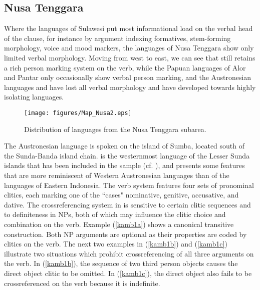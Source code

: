 \subsection{Nusa Tenggara} \label{sec:nus}

Where the languages of Sulawesi put most informational load on the verbal head of the clause, for instance by argument indexing formatives, stem-forming morphology, voice and mood markers, the languages of Nusa Tenggara show only limited verbal morphology. Moving from west to east, we can see that  still retains a rich person marking system on the verb, while the Papuan languages of Alor and Pantar only occasionally show verbal person marking, and the Austronesian languages  and  have lost all verbal morphology and have developed towards highly isolating languages.

\begin{figure}
\texttt{[image: figures/Map\_Nusa2.eps]}
\caption{Distribution of languages from the Nusa Tenggara subarea.}\label{map:Nus}

\end{figure}  

\largerpage[-1]
The Austronesian language  is spoken on the island of Sumba, located south of the Sunda-Banda island chain.  is the westernmost language of the Lesser Sunda islands that has been included in the sample (cf. ), and presents some features that are more reminiscent of Western Austronesian languages than of the languages of Eastern Indonesia. The verb system features four sets of pronominal clitics, each marking one of the ``cases" nominative, genitive, accusative, and dative. The crossreferencing system in  is sensitive to certain clitic sequences and to definiteness in NPs, both of which may influence the clitic choice and combination on the verb. Example (\ref{kamb1a}) shows a canonical transitive construction. Both NP arguments are optional as their properties are coded by clitics on the verb. The next two examples in (\ref{kamb1b}) and (\ref{kamb1c}) illustrate two situations which prohibit crossreferencing of all three arguments on the verb. In (\ref{kamb1b}), the sequence of two third person objects causes the direct object clitic to be omitted. In (\ref{kamb1c}), the direct object also fails to be crossreferenced on the verb because it is indefinite.

